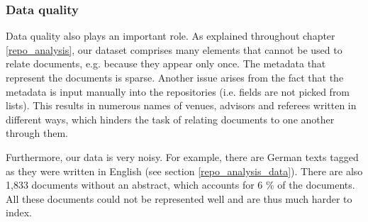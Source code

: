 \subsubsection{Data quality}

Data quality also plays an important role. As explained throughout chapter \ref{repo_analysis}, our dataset comprises many elements that cannot be used to relate documents, e.g. because they appear only once. The metadata that represent the documents is sparse. Another issue arises from the fact that the metadata is input manually into the repositories (i.e. fields are not picked from lists). This results in numerous names of venues, advisors and referees written in different ways, which hinders the task of relating documents to one another through them.

Furthermore, our data is very noisy. For example, there are German texts tagged as they were written in English (see section \ref{repo_analysis_data}). There are also 1,833 documents without an abstract, which accounts for 6 \% of the documents. All these documents could not be represented well and are thus much harder to index.